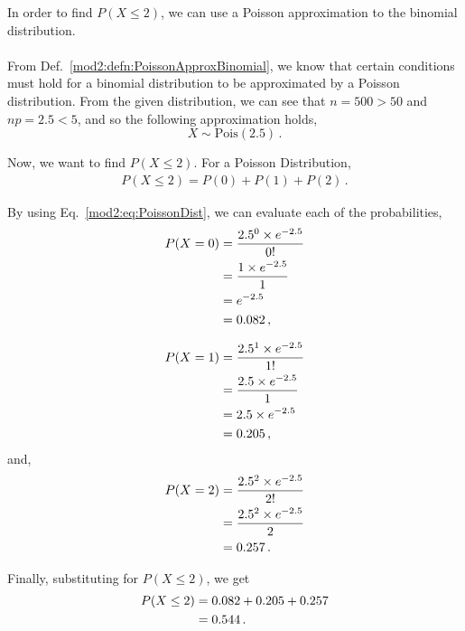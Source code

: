 \begin{subquestions}
\subquestion

In order to find $P(X\leq2)$, we can use a Poisson approximation to the binomial distribution. \\ \\
From Def.~\ref{mod2:defn:PoissonApproxBinomial}, we know that certain conditions must hold for a binomial distribution to be approximated by a Poisson distribution.
From the given distribution, we can see that $n=500>50$ and $np=2.5<5$, and so the following approximation holds,
\begin{equation}
   X \sim \text{Pois} (2.5) \,.
\end{equation}

Now, we want to find $P(X\leq2)$. For a Poisson Distribution, 
\begin{align}
	P(X \leq 2) = P(0) + P(1) + P(2) \,.
\end{align}

By using Eq.~\ref{mod2:eq:PoissonDist}, we can evaluate each of the probabilities, 
\begin{align}
	P(X = 0) & =\frac{ 2.5 ^ 0 \times e^{-2.5}}{0!} \nonumber \\
  & =\frac{1 \times e^{-2.5}}{1} \nonumber \\
  & =e^{-2.5} \nonumber \\
  & = 0.082 \,,
\end{align}

\begin{align}
	P(X = 1) & =\frac{ 2.5 ^ 1 \times e^{-2.5}}{1!} \nonumber \\
	& =\frac{2.5 \times e^{-2.5}}{1} \nonumber \\
	& =2.5 \times e^{-2.5} \nonumber \\
	& = 0.205 \,,
\end{align}
and,
\begin{align}
	P(X = 2) & =\frac{ 2.5 ^ 2 \times e^{-2.5}}{2!} \nonumber \\
	& =\frac{2.5^2 \times e^{-2.5}}{2} \nonumber \\
	& = 0.257\,.
\end{align}
	
Finally, substituting for $P(X \leq 2)$, we get 
\begin{align}
		P(X \leq 2) & = 0.082 + 0.205 + 0.257 \nonumber \\
		& = 0.544 \,.
\end{align}


\end{subquestions}
